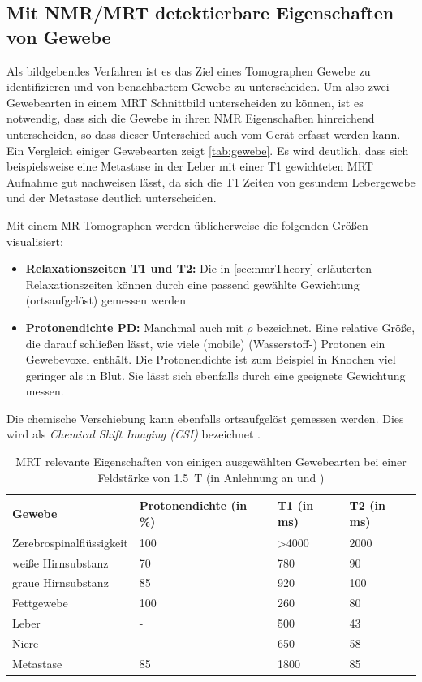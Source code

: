 \subsection{Mit NMR/MRT detektierbare Eigenschaften von Gewebe}
Als bildgebendes Verfahren ist es das Ziel eines Tomographen Gewebe zu identifizieren und von benachbartem Gewebe zu unterscheiden. Um also zwei Gewebearten in einem MRT Schnittbild unterscheiden zu können, ist es notwendig, dass sich die Gewebe in ihren NMR Eigenschaften hinreichend unterscheiden, so dass dieser Unterschied auch vom Gerät erfasst werden kann. Ein Vergleich einiger Gewebearten zeigt \autoref{tab:gewebe}. Es wird deutlich, dass sich beispielsweise eine Metastase in der Leber mit einer T1 gewichteten MRT Aufnahme gut nachweisen lässt, da sich die T1 Zeiten von gesundem Lebergewebe und der Metastase deutlich unterscheiden.

Mit einem MR-Tomographen werden üblicherweise die folgenden Größen visualisiert:
\begin{itemize}
	\item \textbf{Relaxationszeiten T1 und T2:} Die in \autoref{sec:nmrTheory} erläuterten Relaxationszeiten können durch eine passend gewählte Gewichtung (ortsaufgelöst) gemessen werden
	\item \textbf{Protonendichte PD:} Manchmal auch mit $\rho$ bezeichnet. Eine relative Größe, die darauf schließen lässt, wie viele (mobile) (Wasserstoff-) Protonen ein Gewebevoxel enthält. Die Protonendichte ist zum Beispiel in Knochen viel geringer als in Blut. Sie lässt sich ebenfalls durch eine geeignete Gewichtung messen.  
\end{itemize}

Die chemische Verschiebung kann ebenfalls ortsaufgelöst gemessen werden. Dies wird als \textit{Chemical Shift Imaging (CSI)} bezeichnet \cite{Keevil2006}.

\begin{table}[H]
	\centering
	\caption[MRT relevante Eigenschaften ausgewählter Gewebe]{MRT relevante Eigenschaften von einigen ausgewählten Gewebearten bei einer Feldstärke von \SI{1.5}{\tesla} (in Anlehnung an \cite[S.~16]{Weishaupt2014} und \cite[S.~17]{Reiser2008})}
	\label{tab:gewebe}
	\begin{tabular}{llll}
		\toprule
		\textbf{Gewebe} & \textbf{Protonendichte (in \%)} & \textbf{T1 (in ms)} & \textbf{T2 (in ms)} \\
		\midrule
		Zerebrospinalflüssigkeit & 100 & \textgreater4000 & 2000 \\
		weiße Hirnsubstanz & 70 & 780 & 90 \\
		graue Hirnsubstanz & 85 & 920 & 100 \\
		Fettgewebe & 100 & 260 & 80 \\
		Leber & - & 500 & 43 \\
		Niere & - & 650 & 58 \\
		Metastase & 85 & 1800 & 85 \\
		\bottomrule
	\end{tabular}
\end{table}

